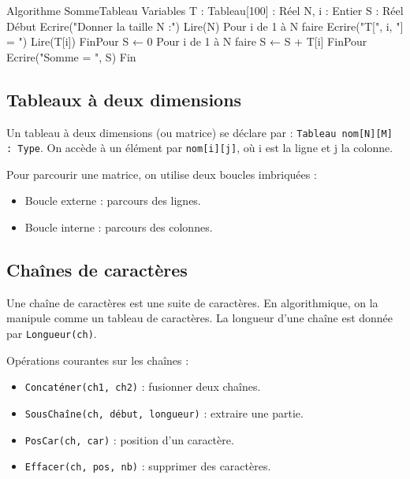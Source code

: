 \begin{exemple}
\begin{algo}
Algorithme SommeTableau
Variables
    T : Tableau[100] : Réel
    N, i : Entier
    S : Réel
Début
    Ecrire("Donner la taille N :")
    Lire(N)
    Pour i de 1 à N faire
        Ecrire("T[", i, "] = ")
        Lire(T[i])
    FinPour
    S ← 0
    Pour i de 1 à N faire
        S ← S + T[i]
    FinPour
    Ecrire("Somme = ", S)
Fin
\end{algo}
\end{exemple}

\subsection{Tableaux à deux dimensions}

\begin{definition}[Matrice]
Un tableau à deux dimensions (ou matrice) se déclare par : \texttt{Tableau nom[N][M] : Type}. On accède à un élément par \texttt{nom[i][j]}, où i est la ligne et j la colonne.
\end{definition}

\begin{aretenir}
Pour parcourir une matrice, on utilise deux boucles imbriquées :
\begin{itemize}
    \item Boucle externe : parcours des lignes.
    \item Boucle interne : parcours des colonnes.
\end{itemize}
\end{aretenir}

\subsection{Chaînes de caractères}

\begin{definition}[Chaîne]
Une chaîne de caractères est une suite de caractères. En algorithmique, on la manipule comme un tableau de caractères. La longueur d'une chaîne est donnée par \texttt{Longueur(ch)}.
\end{definition}

\begin{propriete}
Opérations courantes sur les chaînes :
\begin{itemize}
    \item \texttt{Concaténer(ch1, ch2)} : fusionner deux chaînes.
    \item \texttt{SousChaîne(ch, début, longueur)} : extraire une partie.
    \item \texttt{PosCar(ch, car)} : position d'un caractère.
    \item \texttt{Effacer(ch, pos, nb)} : supprimer des caractères.
\end{itemize}
\end{propriete}


